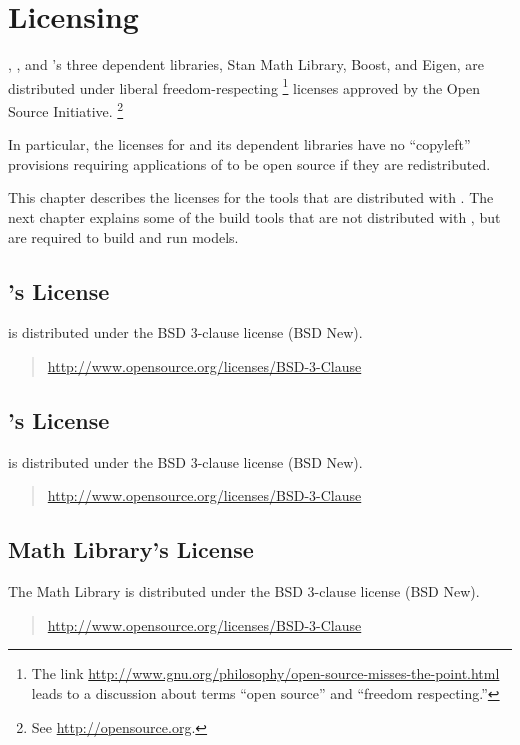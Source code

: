 \chapter{Licensing}\label{licensing.appendix}

\noindent
\CmdStan, \Stan, and \Stan's three dependent libraries, Stan Math Library, Boost, and Eigen, are
distributed under liberal freedom-respecting%
%
\footnote{The link
  \url{http://www.gnu.org/philosophy/open-source-misses-the-point.html}
  leads to a discussion about terms ``open
  source'' and ``freedom respecting.''}
%
licenses approved by the Open Source Initiative.%
\footnote{See \url{http://opensource.org}.}  

In particular, the licenses for \CmdStan and its dependent libraries
have no ``copyleft'' provisions requiring applications of \CmdStan to
be open source if they are redistributed.

This chapter describes the licenses for the tools that are distributed
with \CmdStan.  The next chapter explains some of the build tools that
are not distributed with \CmdStan, but are required to build and run
\Stan models.

\section{\CmdStan's License}

\CmdStan is distributed under the BSD 3-clause license (BSD New).
%
\begin{quote}
\url{http://www.opensource.org/licenses/BSD-3-Clause}
\end{quote}

\section{\Stan's License}

\Stan is distributed under the BSD 3-clause license (BSD New).
%
\begin{quote}
\url{http://www.opensource.org/licenses/BSD-3-Clause}
\end{quote}

\section{\Stan Math Library's License}

The \Stan Math Library is distributed under the BSD 3-clause license (BSD New).
%
\begin{quote}
\url{http://www.opensource.org/licenses/BSD-3-Clause}
\end{quote}

